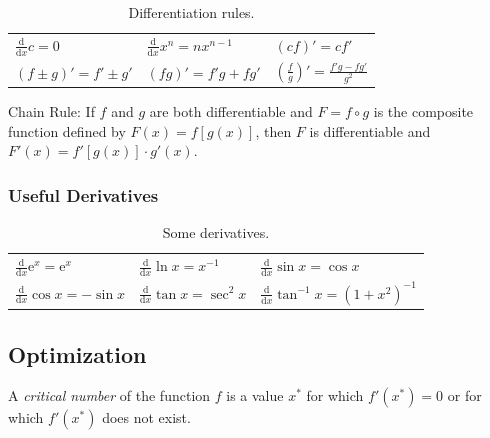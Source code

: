 \documentclass[captions=tableheading]{scrbook}
\begin{document}
\begin{example}
\begin{table}[htb]
\caption[Differentiation rules]{Differentiation rules.} \label{tab-Differentiation-Rules}
\begin{center}
\begin{tabular}{lll}
 \(\frac{\mathrm{d}}{\mathrm{d} x}c=0\)  &  \(\frac{\mathrm{d}}{\mathrm{d} x}x^{n}=nx^{n-1}\)  &  \((cf)'=cf'\)                                        \\
 \((f\pm g)'=f'\pm g'\)                  &  \((fg)'=f'g+fg'\)                                  &  \(\left(\frac{f}{g}\right)'=\frac{f'g-fg'}{g^{2}}\)  \\
\end{tabular}
\end{center}
\end{table}


\begin{thm}
Chain Rule: If \(f\) and \(g\) are both differentiable and \(F=f\circ g\) is the composite function defined by \(F(x)=f[g(x)]\), then \(F\) is differentiable and \(F'(x) = f'[ g(x) ] \cdot g'(x)\).  
\end{thm}
\subsubsection{Useful Derivatives}
\label{sec-21-2-2-2}



\begin{table}[htb]
\caption[Some derivatives]{Some derivatives.} \label{tab-Useful-Derivatives}
\begin{center}
\begin{tabular}{lll}
 \(\frac{\mathrm{d}}{\mathrm{d} x}\mathrm{e}^{x}=\mathrm{e}^{x}\)  &  \(\frac{\mathrm{d}}{\mathrm{d} x}\ln x=x^{-1}\)      &  \(\frac{\mathrm{d}}{\mathrm{d} x}\sin x=\cos x\)              \\
 \(\frac{\mathrm{d}}{\mathrm{d} x}\cos x=-\sin x\)                 &  \(\frac{\mathrm{d}}{\mathrm{d} x}\tan x=\sec^{2}x\)  &  \(\frac{\mathrm{d}}{\mathrm{d} x}\tan^{-1}x=(1+x^{2})^{-1}\)  \\
\end{tabular}
\end{center}
\end{table}
\subsection{Optimization}
\label{sec-21-2-3}

\begin{defn}
A \emph{critical number} of the function \(f\) is a value \(x^{\ast}\) for which \(f'(x^{\ast})=0\) or for which \(f'(x^{\ast})\) does not exist.
\end{defn}


\end{example}
\end{document}
